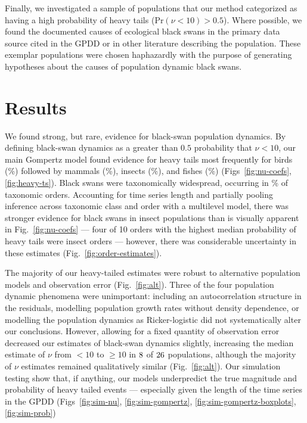 Finally, we investigated a sample of populations that our method categorized as
having a high probability of heavy tails (Pr$(\nu < 10) > 0.5$). Where
possible, we found the documented causes of ecological black swans in the
primary data source cited in the GPDD or in other literature describing the
population. These exemplar populations were chosen haphazardly with the purpose
of generating hypotheses about the causes of population dynamic black swans.

\section{Results}

We found strong, but rare, evidence for black-swan population dynamics. By
defining black-swan dynamics as a greater than $0.5$ probability that $\nu
< 10$, our main Gompertz model found evidence for heavy tails most frequently
for birds (\birdPH\%) followed by mammals (\mammalsPH\%), insects
(\insectsPH\%), and fishes (\fishPH\%) (Figs~\ref{fig:nu-coefs},
\ref{fig:heavy-ts}). Black swans were taxonomically widespread, occurring in
\POrdersHeavy\% of taxonomic orders. Accounting for time series length and
partially pooling inference across taxonomic class and order with a multilevel
model, there was stronger evidence for black swans in insect populations than
is visually apparent in Fig.~\ref{fig:nu-coefs} --- four of 10 orders with the
highest median probability of heavy tails were insect orders --- however, there
was considerable uncertainty in these estimates
(Fig.~\ref{fig:order-estimates}).

The majority of our heavy-tailed estimates were robust to alternative
population models and observation error (Fig.~\ref{fig:alt}). Three of the four
population dynamic phenomena were unimportant:
including an autocorrelation structure in the residuals, modelling population
growth rates without density dependence, or modelling the population dynamics
as Ricker-logistic did not systematically alter our conclusions. However,
allowing for a fixed quantity of observation error decreased our estimates of
black-swan dynamics slightly, increasing the median estimate of $\nu$ from
$<10$ to $\ge 10$ in $8$ of $26$ populations,
although the majority of $\nu$ estimates remained qualitatively similar
(Fig.~\ref{fig:alt}).
Our simulation testing show that, if anything, our models underpredict the true
magnitude and probability of heavy tailed events --- especially given the
length of the time series in the GPDD (Figs~\ref{fig:sim-nu},
\ref{fig:sim-gompertz}, \ref{fig:sim-gompertz-boxplots}, \ref{fig:sim-prob})

